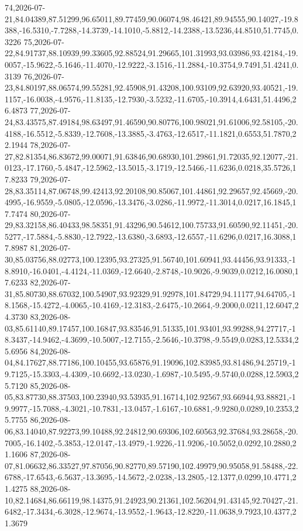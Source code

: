\documentclass{eic-bcc-tcc}
\begin{document}
{74,2026-07-21,84.04389,87.51299,96.65011,89.77459,90.06074,98.46421,89.94555,90.14027,-19.8388,-16.5310,-7.7288,-14.3739,-14.1010,-5.8812,-14.2388,-13.5236,44.8510,51.7745,0.3226
75,2026-07-22,84.91737,88.10939,99.33605,92.88524,91.29665,101.31993,93.03986,93.42184,-19.0057,-15.9622,-5.1646,-11.4070,-12.9222,-3.1516,-11.2884,-10.3754,9.7491,51.4241,0.3139
76,2026-07-23,84.80197,88.06574,99.55281,92.45908,91.43208,100.93109,92.63920,93.40521,-19.1157,-16.0038,-4.9576,-11.8135,-12.7930,-3.5232,-11.6705,-10.3914,4.6431,51.4496,26.4873
77,2026-07-24,83.43575,87.49184,98.63497,91.46590,90.80776,100.98021,91.61006,92.58105,-20.4188,-16.5512,-5.8339,-12.7608,-13.3885,-3.4763,-12.6517,-11.1821,0.6553,51.7870,22.1944
78,2026-07-27,82.81354,86.83672,99.00071,91.63846,90.68930,101.29861,91.72035,92.12077,-21.0123,-17.1760,-5.4847,-12.5962,-13.5015,-3.1719,-12.5466,-11.6236,0.0218,35.5726,17.8233
79,2026-07-28,83.35114,87.06748,99.42413,92.20108,90.85067,101.44861,92.29657,92.45669,-20.4995,-16.9559,-5.0805,-12.0596,-13.3476,-3.0286,-11.9972,-11.3014,0.0217,16.1845,17.7474
80,2026-07-29,83.32158,86.40433,98.58351,91.43296,90.54612,100.75733,91.60590,92.11451,-20.5277,-17.5884,-5.8830,-12.7922,-13.6380,-3.6893,-12.6557,-11.6296,0.0217,16.3088,17.8987
81,2026-07-30,85.03756,88.02773,100.12395,93.27325,91.56740,101.60941,93.44456,93.91333,-18.8910,-16.0401,-4.4124,-11.0369,-12.6640,-2.8748,-10.9026,-9.9039,0.0212,16.0080,17.6233
82,2026-07-31,85.80730,88.67032,100.54907,93.92329,91.92978,101.84729,94.11177,94.64705,-18.1568,-15.4272,-4.0065,-10.4169,-12.3183,-2.6475,-10.2664,-9.2000,0.0211,12.6047,24.3730
83,2026-08-03,85.61140,89.17457,100.16847,93.83546,91.51335,101.93401,93.99288,94.27717,-18.3437,-14.9462,-4.3699,-10.5007,-12.7155,-2.5646,-10.3798,-9.5549,0.0283,12.5334,25.6956
84,2026-08-04,84.17627,88.77186,100.10455,93.65876,91.19096,102.83985,93.81486,94.25719,-19.7125,-15.3303,-4.4309,-10.6692,-13.0230,-1.6987,-10.5495,-9.5740,0.0288,12.5903,25.7120
85,2026-08-05,83.87730,88.37503,100.23940,93.53935,91.16714,102.92567,93.66944,93.88821,-19.9977,-15.7088,-4.3021,-10.7831,-13.0457,-1.6167,-10.6881,-9.9280,0.0289,10.2353,25.7755
86,2026-08-06,83.14040,87.92273,99.10488,92.24812,90.69306,102.60563,92.37684,93.28658,-20.7005,-16.1402,-5.3853,-12.0147,-13.4979,-1.9226,-11.9206,-10.5052,0.0292,10.2880,21.1606
87,2026-08-07,81.06632,86.33527,97.87056,90.82770,89.57190,102.49979,90.95058,91.58488,-22.6788,-17.6543,-6.5637,-13.3695,-14.5672,-2.0238,-13.2805,-12.1377,0.0299,10.4771,21.4275
88,2026-08-10,82.14684,86.66119,98.14375,91.24923,90.21361,102.56204,91.43145,92.70427,-21.6482,-17.3434,-6.3028,-12.9674,-13.9552,-1.9643,-12.8220,-11.0638,9.7923,10.4377,21.3679
}
\end{document}

